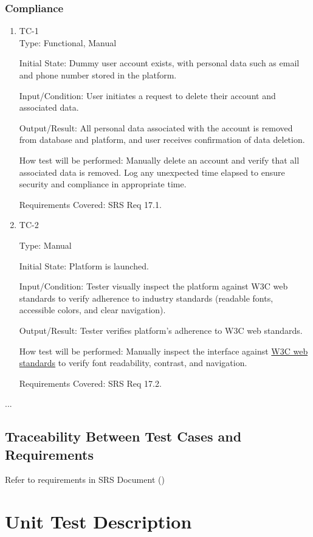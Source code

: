 \documentclass[12pt, titlepage]{article}
\begin{document}
\subsubsection{Compliance}
\begin{enumerate}
\item{TC-1\\}
Type: Functional, Manual
					
Initial State: Dummy user account exists, with personal data such as email and phone number stored in the platform.
					
Input/Condition: User initiates a request to delete their account and associated data.
					
Output/Result: All personal data associated with the account is removed from database and platform, and user receives confirmation of data deletion.
					
How test will be performed: Manually delete an account and verify that all associated data is removed. Log any unexpected time elapsed to ensure security and compliance in appropriate time.

Requirements Covered: SRS Req 17.1.

\item{TC-2\\}

Type: Manual
					
Initial State: Platform is launched.
					
Input/Condition: Tester visually inspect the platform against W3C web standards to verify adherence to industry standards (readable fonts, accessible colors, and clear navigation).
					
Output/Result: Tester verifies platform's adherence to W3C web standards.
					
How test will be performed: Manually inspect the interface against \href{https://www.w3.org/standards/}{W3C web standards} to verify font readability, contrast, and navigation.

Requirements Covered: SRS Req 17.2.
\end{enumerate}

...

\subsection{Traceability Between Test Cases and Requirements}

Refer to requirements in SRS Document () 

\section{Unit Test Description}
\end{document}
